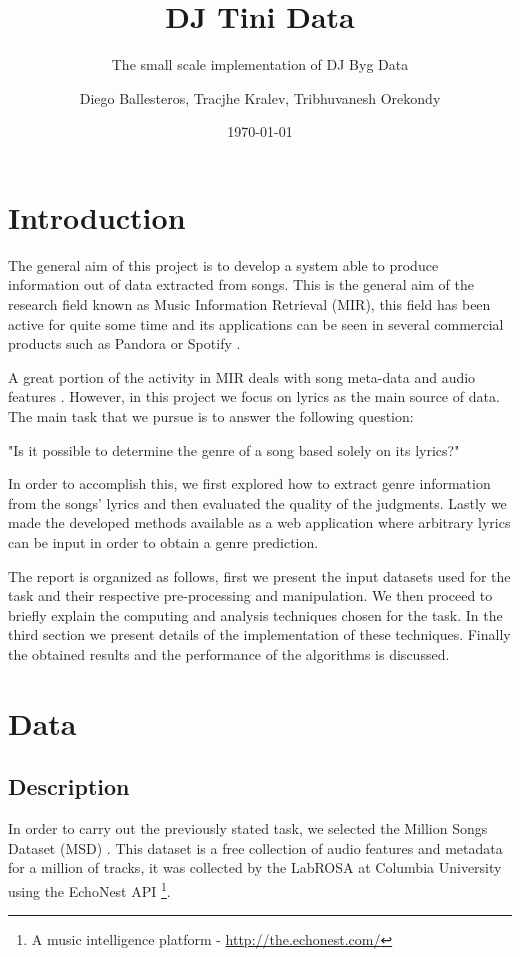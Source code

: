 \documentclass[11pt,a4paper,twoside]{scrartcl}
\author{Diego Ballesteros, Tracjhe Kralev, Tribhuvanesh Orekondy}
\title{DJ Tini Data}
\subtitle{The small scale implementation of DJ Byg Data}
\date{\today}
\begin{document}
  \maketitle
  \section{Introduction}
    The general aim of this project is to develop a system able to produce
    information out of data extracted from songs. This is the general
    aim of the research field known as Music Information Retrieval (MIR),
    this field has been active for quite some time \cite{nameThatTune:1993}
    and its applications can be seen in several commercial products such as
    Pandora or Spotify \cite{recommendation:2010}.

    A great portion of the activity in MIR deals with song meta-data and audio
    features \cite{McFee:2012:MSD:2187980.2188222}. However, in this project we
    focus on lyrics as the main source of data.
    The main task that we pursue is to answer the following question:
    
    "Is it possible to determine the genre of a song based solely on its
    lyrics?"
     
    In order to accomplish this, we first explored how to extract genre
    information from the songs' lyrics and then evaluated the quality of the
    judgments. Lastly we made the developed methods available as a web
    application where arbitrary lyrics can be input in order to obtain
    a genre prediction.
    
    The report is organized as follows, first we present the input datasets used
    for the task and their respective pre-processing and manipulation. We then
    proceed to briefly explain the computing and analysis techniques chosen for
    the task. In the third section we present details of the implementation of
    these techniques. Finally the obtained results and the performance of the
    algorithms is discussed.
  \section{Data}
    \subsection{Description}
    In order to carry out the previously stated task, we selected the Million
    Songs Dataset (MSD) \cite{Bertin-Mahieux2011}.
    This dataset is a free collection of audio features and metadata for a million
    of tracks, it was collected by the LabROSA at Columbia University using
    the EchoNest API
    \footnote{A music intelligence platform - \url{http://the.echonest.com/}}.
    
\end{document}
